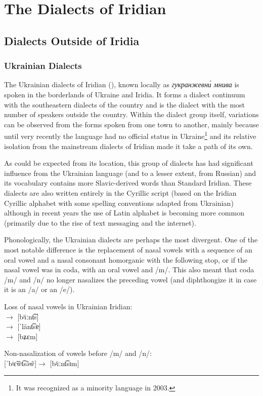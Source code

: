 \chapter{The Dialects of Iridian}


\section{Dialects Outside of Iridia}

\subsection{Ukrainian Dialects}

The Ukrainian dialects of Iridian (), known locally as \textit{\cyrtext гукран\-же\-вн\'и мни\-ва} is spoken in the borderlands of Ukraine and Iridia. It forms a dialect continuum with the southeastern dialects of the country and is the dialect with the most number of speakers outside the country. Within the dialect group itself, variations can be observed from the forms spoken from one town to another, mainly because until very recently the language had no official status in Ukraine\footnote{It was recognized as a minority language in 2003.} and its relative isolation from the mainstream dialects of Iridian made it take a path of its own.

As could be expected from its location, this group of dialects has had significant influence from the Ukrainian language (and to a lesser extent, from Russian) and its vocabulary contains more Slavic-derived words than Standard Iridian. These dialects are also written entirely in the Cyrillic script (based on the Iridian Cyrillic alphabet with some spelling conventions adapted from Ukrainian) although in recent years the use of Latin alphabet is becoming more common (primarily due to the rise of text messaging and the internet).

Phonologically, the Ukrainian dialects are perhaps the most divergent. One of the most notable difference is the replacement of nasal vowels with a sequence of an oral vowel and a nasal consonant homorganic with the following stop, or if the nasal vowel was in coda, with an oral vowel and /m/. This also meant that coda /m/ and /n/ no longer nasalizes the preceding vowel (and diphthongize it in case it is an /a/ or an /e/).

\ex
Loss of nasal vowels in Ukrainian Iridian:\\
\quad$\rightarrow$\quad{} [bʲiːnt͡s]\\
\quad$\rightarrow$\quad{} [ˈlänt͡sɐ]\\
\quad$\rightarrow$\quad{} [bʑɛm]
\xe

\ex
Non-nasalization of vowels before /m/ and /n/:\\
[ˈbʲɛ̃w̃t͡sə̃w̃]\quad$\rightarrow$\quad{} [bʲiːnt͡sɪm]\\

\xe
